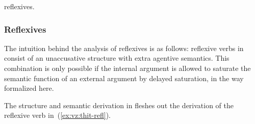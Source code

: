 \begin{exe}
\begin{xlist}
\begin{xlist}
\begin{exe}
\begin{xlist}
\begin{xlist}
\begin{exe}
\begin{xlist}
\begin{xlist}
\begin{exe}
\begin{exe}
\begin{xlist}
\begin{exe}
\begin{exe}
\begin{xlist}
\begin{exe}
\begin{exe}
\begin{exe}
\begin{exe}
\begin{exe}
\begin{xlist}
\begin{exe}
\begin{xlist}
\begin{exe}
\begin{exe}
\begin{xlist}
\begin{exe}
\begin{xlist}
\begin{exe}
\begin{xlist}
\begin{exe}
\begin{exe}
\begin{exe}
\begin{xlist}
\begin{exe}
\begin{exe}
\begin{exe}
\begin{xlist}
\begin{exe}
\begin{xlist}
\begin{exe}
\begin{exe}
\begin{xlist}
\begin{exe}
\begin{exe}
\begin{exe}
\begin{exe}
\begin{xlist}
\begin{exe}
\begin{xlist}
\begin{exe}
\begin{xlist}
\begin{exe}
\begin{xlist}
\begin{exe}
\begin{xlist}
\begin{exe}
\begin{xlist}
\begin{exe}
\begin{exe}
\begin{xlist}
\begin{exe}
\begin{xlist}
\begin{exe}
\begin{exe}
\begin{xlist}
\begin{exe}
\begin{xlist}
\begin{exe}
\begin{exe}
\begin{exe}
\begin{exe}
\begin{xlist}
\begin{xlist}
\begin{exe}
\begin{xlist}
\begin{exe}
\begin{exe}
\begin{exe}
\begin{xlist}
\begin{exe}
\begin{exe}
\begin{xlist}
\begin{exe}
\begin{exe}
\begin{exe}
\begin{xlist}
\begin{xlist}
\begin{exe}
\begin{xlist}
\begin{exe}
\begin{exe}
\begin{exe}
\begin{exe}
\begin{xlist}
\begin{exe}
\begin{xlist}
\begin{exe}
\begin{xlist}
\begin{exe}
\begin{xlist}
\begin{exe}
\begin{exe}
reflexives.

		\subsubsection{Reflexives} \label{vz:va:vzva:refl}
The intuition behind the analysis of reflexives is as follows: reflexive verbs in {\thit} consist of an unaccusative structure with extra agentive semantics. This combination is only possible if the internal argument is allowed to saturate the semantic function of an external argument by delayed saturation, in the way formalized here.

The structure and semantic derivation in  fleshes out the derivation of the reflexive verb in~(\ref{ex:vz:thit-refl}).

 \begin{exe}
\ex  \label{ex:vz:thit-refl} 

\end{exe}
\end{exe}
\end{exe}
\end{xlist}
\end{exe}
\end{xlist}
\end{exe}
\end{xlist}
\end{exe}
\end{xlist}
\end{exe}
\end{exe}
\end{exe}
\end{exe}
\end{xlist}
\end{exe}
\end{xlist}
\end{xlist}
\end{exe}
\end{exe}
\end{exe}
\end{xlist}
\end{exe}
\end{exe}
\end{xlist}
\end{exe}
\end{exe}
\end{exe}
\end{xlist}
\end{exe}
\end{xlist}
\end{xlist}
\end{exe}
\end{exe}
\end{exe}
\end{exe}
\end{xlist}
\end{exe}
\end{xlist}
\end{exe}
\end{exe}
\end{xlist}
\end{exe}
\end{xlist}
\end{exe}
\end{exe}
\end{xlist}
\end{exe}
\end{xlist}
\end{exe}
\end{xlist}
\end{exe}
\end{xlist}
\end{exe}
\end{xlist}
\end{exe}
\end{xlist}
\end{exe}
\end{exe}
\end{exe}
\end{exe}
\end{xlist}
\end{exe}
\end{exe}
\end{xlist}
\end{exe}
\end{xlist}
\end{exe}
\end{exe}
\end{exe}
\end{xlist}
\end{exe}
\end{exe}
\end{exe}
\end{xlist}
\end{exe}
\end{xlist}
\end{exe}
\end{xlist}
\end{exe}
\end{exe}
\end{xlist}
\end{exe}
\end{xlist}
\end{exe}
\end{exe}
\end{exe}
\end{exe}
\end{exe}
\end{xlist}
\end{exe}
\end{exe}
\end{xlist}
\end{exe}
\end{exe}
\end{xlist}
\end{xlist}
\end{exe}
\end{xlist}
\end{xlist}
\end{exe}
\end{xlist}
\end{xlist}
\end{exe}
